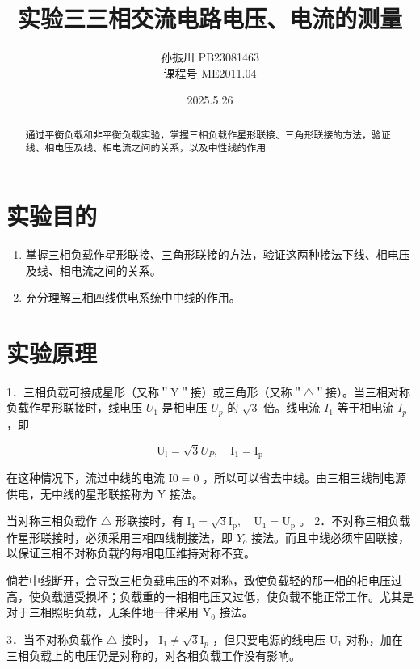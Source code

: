 \documentclass{article}
\title{\heiti\zihao{2}实验三\quad 三相交流电路电压、电流的测量 }
\author{\songti  孙振川  PB23081463 \\
课程号  ME2011.04 }
\date{2025.5.26}
\begin{document}
    \maketitle
\begin{abstract}
    
    通过平衡负载和非平衡负载实验，掌握三相负载作星形联接、三角形联接的方法，验证线、相电压及线、相电流之间的关系，以及中性线的作用
    
\end{abstract}
\section{实验目的}
\begin{enumerate}
    \item 掌握三相负载作星形联接、三角形联接的方法，验证这两种接法下线、相电压及线、相电流之间的关系。 
    \item 充分理解三相四线供电系统中中线的作用。
\end{enumerate}

\section{实验原理}
1．三相负载可接成星形（又称＂Y＂接）或三角形（又称＂$\triangle$＂接）。当三相对称负载作星形联接时，线电压 $U_1$ 是相电压 $U_p$ 的 $\sqrt{3}$ 倍。线电流 $I_1$ 等于相电流 $I_p$ ，即

$$
\mathrm{U}_{\mathrm{l}}=\sqrt{3} U_P, \quad \mathrm{I}_1=\mathrm{I}_{\mathrm{p}}
$$


在这种情况下，流过中线的电流 $\mathrm{I} 0=0$ ，所以可以省去中线。由三相三线制电源供电，无中线的星形联接称为 Y 接法。

当对称三相负载作 $\triangle$ 形联接时，有 $\mathrm{I}_1=\sqrt{3} \mathrm{I}_{\mathrm{p}}, \quad \mathrm{U}_1=\mathrm{U}_{\mathrm{p}}$ 。
2．不对称三相负载作星形联接时，必须采用三相四线制接法，即 $Y_o$ 接法。而且中线必须牢固联接，以保证三相不对称负载的每相电压维持对称不变。

倘若中线断开，会导致三相负载电压的不对称，致使负载轻的那一相的相电压过高，使负载遭受损坏；负载重的一相相电压又过低，使负载不能正常工作。尤其是对于三相照明负载，无条件地一律采用 $\mathrm{Y}_0$ 接法。

3．当不对称负载作 $\triangle$ 接时， $\mathrm{I}_1 \neq \sqrt{3} \mathrm{I}_p$ ，但只要电源的线电压 $\mathrm{U}_1$ 对称，加在三相负载上的电压仍是对称的，对各相负载工作没有影响。
\end{document}
